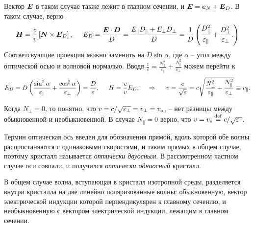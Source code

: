 Вектор $\mbox{\boldmath $E$}$ в таком случае также лежит в главном сечении, и $\mbox{\boldmath $E$} = \mbox{\boldmath $e$}_N + \mbox{\boldmath $E$}_D$. В таком случае, верно
\begin{equation*}
    \mbox{\boldmath $H$} = \frac{c}{v} \left[\mbox{\boldmath $N$} \times \mbox{\boldmath $E$}_D\right],
    \hspace{5 mm} 
    E_D = \frac{\mbox{\boldmath $E$} \cdot \mbox{\boldmath $D$}}{D} = \frac{E_\parallel D_\parallel + E_\bot D_\bot}{D} = \frac{1}{D} \left(
        \frac{D_\parallel^2}{\varepsilon_\parallel} + \frac{D_\bot^2}{\varepsilon_\bot}.
    \right)
\end{equation*}
Соответсвующие проекции можно заменить на $D \sin \alpha$, где $\alpha$ -- угол между оптической осью и волновой нормалью. Вводя $\frac{1}{\varepsilon} = \frac{N^2_\bot}{\varepsilon_\parallel}+\frac{N^2_\parallel}{\varepsilon_\bot}$ можем перейти к
\begin{equation*}
    E_D = D\left(
        \frac{\sin^2 \alpha}{\varepsilon_\parallel} + \frac{\cos^2 \alpha}{\varepsilon_\bot}
    \right) = \frac{D}{\varepsilon},
    \hspace{5 mm} 
    H = \frac{c}{v} E_D,
    \hspace{0.5cm} \Rightarrow \hspace{0.5cm}
     v = \frac{c}{\sqrt{\varepsilon}} = c \sqrt{\frac{N^2_\bot}{\varepsilon_\parallel}+\frac{N_\parallel^2}{\varepsilon_\bot}}\equiv v_\parallel.
\end{equation*}


Когда $N_\bot =0$, то понятно, что $v = c/\sqrt{\varepsilon_\bot} = v_\bot = v_{\textnormal{o}}$, -- нет разницы между обыкновенной и необыкновенной. В случае $N_\parallel = 0$  верно, что $v = v_{\textnormal{e}} \overset{\mathrm{def}}{=} c/\sqrt{\varepsilon_\parallel}$. 

Термин оптическая ось введен для обозначения прямой, вдоль которой обе волны распростаняются с одинаковыми скоростями, и таким прямых в общем случае, поэтому кристалл называется \textit{оптически двуосным}. В рассмотренном частном случае оси совпали, и получился \textit{оптически одноосный} кристалл.


\begin{to_lem}
    В общем случае волна, вступающая в кристалл изотропной среды, разделяется внутри кристалла на две линейно поляризованные волны: обыкновенную, вектор электрической индукции которой перпендикулярен к главному сечению,
    и необыкновенную с вектором электрической индукции, лежащим в главном сечении.
\end{to_lem}

